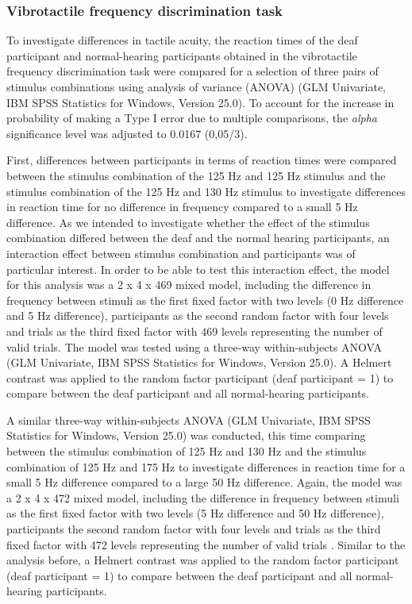 \documentclass[12pt]{article}
\begin{document}
\subsubsection{Vibrotactile frequency discrimination task}
To investigate differences in tactile acuity, the reaction times of the deaf participant and normal-hearing participants obtained in the vibrotactile frequency discrimination task were compared for a selection of three pairs of stimulus combinations using analysis of variance (ANOVA) (GLM Univariate, IBM SPSS Statistics for Windows, Version 25.0). To account for the increase in probability of making a Type I error due to multiple comparisons, the \textit{alpha} significance level was adjusted to 0.0167 (0,05/3). 
%
\par First, differences between participants in terms of reaction times were compared between the stimulus combination of the 125 Hz and 125 Hz stimulus and the stimulus combination of the 125 Hz and 130 Hz stimulus to investigate differences in reaction time for no difference in frequency compared to a small 5 Hz difference. As we intended to investigate whether the effect of the stimulus combination differed between the deaf and the normal hearing participants, an interaction effect between stimulus combination and participants was of particular interest. In order to be able to test this interaction effect, the model for this analysis was a 2 x 4 x 469 mixed model, including the difference in frequency between stimuli as the first fixed factor with two levels (0 Hz difference and 5 Hz difference), participants as the second random factor with four levels and trials as the third fixed factor with 469 levels representing the number of valid trials. The model was tested using a three-way within-subjects ANOVA (GLM Univariate, IBM SPSS Statistics for Windows, Version 25.0). A Helmert contrast was applied to the random factor participant (deaf participant = 1) to compare between the deaf participant and all normal-hearing participants. 
%
\par A similar three-way within-subjects ANOVA (GLM Univariate, IBM SPSS Statistics for Windows, Version 25.0) was conducted, this time comparing between the stimulus combination of 125 Hz and 130 Hz and the stimulus combination of 125 Hz and 175 Hz to investigate differences in reaction time for a small 5 Hz difference compared to a large 50 Hz difference. Again, the model was a 2 x 4 x 472 mixed model, including the difference in frequency between stimuli as the first fixed factor with two levels (5 Hz difference and 50 Hz difference), participants the second random factor with four levels and trials as the third fixed factor with 472 levels representing the number of valid trials . Similar to the analysis before, a Helmert contrast was applied to the random factor participant (deaf participant = 1) to compare between the deaf participant and all normal-hearing participants. 
\end{document}
